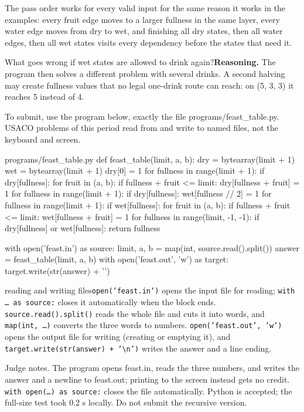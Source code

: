 \documentclass[11pt,a4paper,oneside]{report}
\begin{document}
The pass order works for every valid input for the same reason it works in the examples: every fruit edge moves to a larger fullness in the same layer, every water edge moves from dry to wet, and finishing all dry states, then all water edges, then all wet states visits every dependency before the states that need it.

\begin{tcolorbox}[before upper={\raggedright},before lower={\raggedright},fontupper=\small,fontlower=\small,colback=white,colframe=ink,boxrule=.6pt,arc=0pt,title={AT THE BOARD},fonttitle=\heavy,coltitle=white,colbacktitle=ink]What goes wrong if wet states are allowed to drink again?\tcblower\textbf{Reasoning.} The program then solves a different problem with several drinks. A second halving may create fullness values that no legal one-drink route can reach: on (5, 3, 3) it reaches 5 instead of 4.\end{tcolorbox}
To submit, use the program below, exactly the file programs/feast\_table.py. USACO problems of this period read from and write to named files, not the keyboard and screen.

\begin{bookcode}{programs/feast\_table.py}
def feast_table(limit, a, b):
    dry = bytearray(limit + 1)
    wet = bytearray(limit + 1)
    dry[0] = 1
    for fullness in range(limit + 1):
        if dry[fullness]:
            for fruit in (a, b):
                if fullness + fruit <= limit:
                    dry[fullness + fruit] = 1
    for fullness in range(limit + 1):
        if dry[fullness]:
            wet[fullness // 2] = 1
    for fullness in range(limit + 1):
        if wet[fullness]:
            for fruit in (a, b):
                if fullness + fruit <= limit:
                    wet[fullness + fruit] = 1
    for fullness in range(limit, -1, -1):
        if dry[fullness] or wet[fullness]:
            return fullness

with open('feast.in') as source:
    limit, a, b = map(int, source.read().split())
answer = feast_table(limit, a, b)
with open('feast.out', 'w') as target:
    target.write(str(answer) + '\n')
\end{bookcode}
\begin{pythonnote}{reading and writing files}\texttt{open('feast.in')} opens the input file for reading; \texttt{with … as source:} closes it automatically when the block ends. \texttt{source.read().split()} reads the whole file and cuts it into words, and \texttt{map(int, …)} converts the three words to numbers. \texttt{open('feast.out', 'w')} opens the output file for writing (creating or emptying it), and \texttt{target.write(str(answer) + '\textbackslash{}n')} writes the answer and a line ending.\end{pythonnote}
Judge notes. The program opens feast.in, reads the three numbers, and writes the answer and a newline to feast.out; printing to the screen instead gets no credit. \texttt{with open(…) as source:} closes the file automatically. Python is accepted; the full-size test took 0.2 s locally. Do not submit the recursive version.
\end{document}
